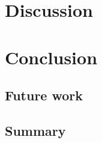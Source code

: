 \documentclass{svproc}
\begin{document}
\section{Discussion}\label{sec:results-discussion}

\section{Conclusion}\label{sec:conclusion}

\subsection{Future work}\label{sec:future-work}

\subsection{Summary}\label{sec:summary}



\end{document}
